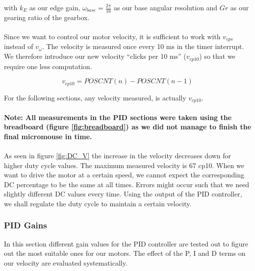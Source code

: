 with $k_E$ as our edge gain, $\omega_{base} = \frac{2\pi}{16}$ as our base angular resolution and $Gr$ as our gearing ratio of the gearbox.
\\\\
Since we want to control our motor velocity, it is sufficient to work with $v_{cps}$ instead of $v_{\omega}$. 
The velocity is measured once every 10 ms in the timer interrupt.
We therefore introduce our new velocity ``clicks per 10 ms'' ($v_{cp10}$) so that we require one less computation.

$$v_{cp10} = POSCNT(n) - POSCNT(n-1)$$

For the following sections, any velocity measured, is actually $v_{cp10}$.
\\\\
\textbf{Note: All measurements in the PID sections were taken using the breadboard (figure \ref{fig:breadboard}) as we did not manage to finish the final micromouse in time.}
\\\\
As seen in figure \ref{fig:DC_V} the increase in the velocity decreases down for higher duty cycle values. The maximum measured velocity is 67 cp10. When we want to drive the motor at a certain speed, we cannot expect the corresponding DC percentage to be the same at all times. Errors might occur such that we need slightly different DC values every time.
Using the output of the PID controller, we shall regulate the duty cycle to maintain a certain velocity.

\subsubsection{PID Gains}
In this section different gain values for the PID controller are tested out to figure out the most suitable ones for our motors. The effect of the P, I and D terms on our velocity are evaluated systematically.


